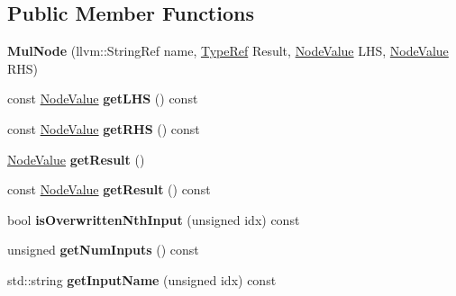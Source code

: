 \subsection*{Public Member Functions}
\begin{DoxyCompactItemize}
\item 
\mbox{\label{classglow_1_1_mul_node_a2b45b362b3e81894ce9671e7ddd0b935}} 
{\bfseries Mul\+Node} (llvm\+::\+String\+Ref name, \hyperlink{structglow_1_1_type}{Type\+Ref} Result, \hyperlink{structglow_1_1_node_value}{Node\+Value} L\+HS, \hyperlink{structglow_1_1_node_value}{Node\+Value} R\+HS)
\item 
\mbox{\label{classglow_1_1_mul_node_affc9a18add82edf095d49c404d33869f}} 
const \hyperlink{structglow_1_1_node_value}{Node\+Value} {\bfseries get\+L\+HS} () const
\item 
\mbox{\label{classglow_1_1_mul_node_ab2b4a29805e20abfb1dc973fa2e325a5}} 
const \hyperlink{structglow_1_1_node_value}{Node\+Value} {\bfseries get\+R\+HS} () const
\item 
\mbox{\label{classglow_1_1_mul_node_a8cce433811dbd3e6ec77ffa810cb3c5f}} 
\hyperlink{structglow_1_1_node_value}{Node\+Value} {\bfseries get\+Result} ()
\item 
\mbox{\label{classglow_1_1_mul_node_aaeb7c971416af10ae2801fe788e0d66d}} 
const \hyperlink{structglow_1_1_node_value}{Node\+Value} {\bfseries get\+Result} () const
\item 
\mbox{\label{classglow_1_1_mul_node_aa3ccf7d0f63cf9ade087fcc3d516be85}} 
bool {\bfseries is\+Overwritten\+Nth\+Input} (unsigned idx) const
\item 
\mbox{\label{classglow_1_1_mul_node_a6a648ba37a72332f285a644356b6f418}} 
unsigned {\bfseries get\+Num\+Inputs} () const
\item 
\mbox{\label{classglow_1_1_mul_node_a8a2c3740fcc354b36c28ce97ceec8fd7}} 
std\+::string {\bfseries get\+Input\+Name} (unsigned idx) const
\item 
\mbox{\label{classglow_1_1_mul_node_a5bf5239b3872d7db109ab00d9ab7e129}} 

\end{DoxyCompactItemize}
